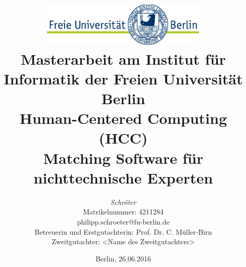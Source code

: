 %
\begin{titlepage}

\title{\includegraphics[width=0.6\textwidth]{pics/FU_logo.pdf}\\
{\small Masterarbeit am Institut für Informatik der Freien Universität Berlin}\\
{\small Human-Centered Computing (HCC)}\\
[6ex]
{\LARGEOntologie Matching Software für nichttechnische Experten}}

\author{
{\emph{\normalsizePhilipp Schröter}}\\
{\normalsize Matrikelnummer: 4211284}\\
{\normalsize philipp.schroeter@fu-berlin.de}\\ 
[18ex]   
{\normalsize Betreuerin und Erstgutachterin: Prof. Dr. C. Müller-Birn} \\
{\normalsize Zweitgutachter: <Name des Zweitgutachters>}}
\vspace{6ex}
\date{\normalsize Berlin, 26.06.2016}
 
\maketitle  

\end{titlepage}